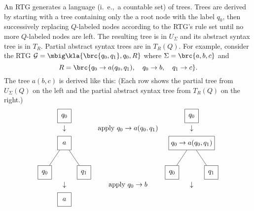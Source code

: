 An RTG generates a language (i.~e.,~a countable set) of trees. Trees are derived
by starting with a tree containing only the a root node with the label $q_0$,
then successively replacing $Q$-labeled nodes according to the RTG's rule set
until no more $Q$-labeled nodes are left. The resulting tree is in $U_\Sigma$
and its abstract syntax tree is in $T_R$. Partial abstract syntax trees are in $T_R(Q)$.
For example, consider the RTG $\ug = \mbig\kla{\brc{q_0,q_1},q_0,R}$ where
$\Sigma=\brc{a,b,c}$ and
\[
 R = \brc{ q_0 \to a(q_0,q_1), \quad q_0 \to b, \quad q_1 \to c }.
\]
The tree $a(b,c)$ is derived like this: (Each row shows the partial tree from
$U_\Sigma(Q)$ on the left and the partial abstract syntax tree from $T_R(Q)$ on
the right.)
\[\begin{matrix}
 \begin{tikzpicture}[every node/.style={rectangle,draw,minimum size=2em},baseline=(current bounding box.center)]
  \node (n) at (0,0) { $q_0$ };
 \end{tikzpicture}
 &&
 \begin{tikzpicture}[every node/.style={rectangle,draw,minimum size=2em},baseline=(current bounding box.center)]
  \node (n) at (0,0) { $q_0$ };
 \end{tikzpicture}
 \\\\[-1em]
 \downarrow & \text{apply } q_0\to a(q_0,q_1) & \downarrow \\[0.5em]
 \begin{tikzpicture}[every node/.style={rectangle,draw,minimum size=2em},baseline=(current bounding box.center)]
  \node (n) at (0,0) { $a$ };
  \node (n1) at (-1,-1.5) { $q_0$ } edge (n);
  \node (n2) at (+1,-1.5) { $q_1$ } edge (n);
 \end{tikzpicture}
 &\hspace*{4em}&
 \begin{tikzpicture}[every node/.style={rectangle,draw,minimum size=2em},baseline=(current bounding box.center)]
  \node (n) at (0,0) { $q_0 \to a(q_0,q_1)$ };
  \node (n1) at (-1,-1.5) { $q_0$ } edge (n);
  \node (n2) at (+1,-1.5) { $q_1$ } edge (n);
 \end{tikzpicture}
 \\\\[-1em]
 \downarrow & \text{apply } q_0\to b & \downarrow \\[0.5em]
 \begin{tikzpicture}[every node/.style={rectangle,draw,minimum size=2em},baseline=(current bounding box.center)]
  \node (n) at (0,0) { $a$ };

\end{tikzpicture}
\end{matrix}\]
